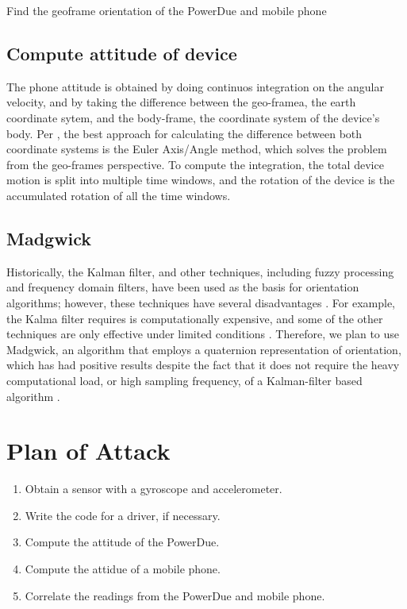 \documentclass[journal]{IEEEtranTIE}
\begin{document}
Find the geoframe orientation of the PowerDue and mobile phone

\subsection{Compute attitude of device}

The phone attitude is obtained by doing continuos integration on the angular
velocity, and by taking the difference between the geo-framea, the earth
coordinate sytem, and the body-frame, the coordinate system of the device's
body. Per \cite{PhoneAttitude}, the best approach for calculating the difference
between both coordinate systems is the Euler Axis/Angle method, which solves the
problem from the geo-frames perspective. To compute the integration, the total
device motion is split into multiple time windows, and the rotation of the
device is the accumulated rotation of all the time windows.

\subsection{Madgwick}

Historically, the Kalman filter, and other techniques, including fuzzy
processing and frequency domain filters, have been used as the basis for
orientation algorithms; however, these techniques have several disadvantages
\cite{Madgwick}. For example, the Kalma filter requires is computationally
expensive, and some of the other techniques are only effective under limited
conditions \cite{Madgwick}. Therefore, we plan to use Madgwick, an algorithm
that employs a quaternion representation of orientation, which has had positive
results despite the fact that it does not require the heavy computational load,
or high sampling frequency, of a Kalman-filter based algorithm \cite{Madgwick}.

\section{Plan of Attack}

\begin{enumerate}
\item Obtain a sensor with a gyroscope and accelerometer.
\item Write the code for a driver, if necessary.
\item Compute the attitude of the PowerDue.
\item Compute the attidue of a mobile phone.
\item Correlate the readings from the PowerDue and mobile phone.
\end{enumerate}
\end{document}
